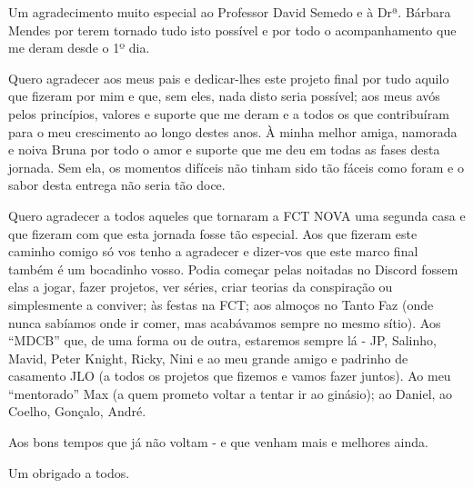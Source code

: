 
%

\begin{ntacknowledgements}


Um agradecimento muito especial ao Professor David Semedo e à Drª. Bárbara 
Mendes por terem tornado tudo isto possível e por todo o acompanhamento que 
me deram desde o 1º dia.

\medskip
Quero agradecer aos meus pais e dedicar-lhes este projeto final
por tudo aquilo que fizeram por mim e que, sem eles, nada disto seria 
possível; aos meus avós pelos princípios, valores e suporte que me deram 
e a todos os que contribuíram para o meu crescimento ao longo destes anos. 
À minha melhor amiga, namorada e noiva Bruna por todo o amor e suporte que me deu em 
todas as fases desta jornada. Sem ela, os momentos difíceis não tinham sido 
tão fáceis como foram e o sabor desta entrega não seria tão doce.

\medskip
Quero agradecer a todos aqueles que tornaram a FCT NOVA uma segunda casa e que
fizeram com que esta jornada fosse tão especial.
Aos que fizeram este caminho comigo só vos tenho a agradecer e dizer-vos 
que este marco final também é um bocadinho vosso. Podia começar pelas 
noitadas no Discord fossem elas a jogar, fazer projetos, ver séries, 
criar teorias da conspiração ou 
simplesmente a conviver; às festas na FCT; aos almoços no Tanto Faz 
(onde nunca sabíamos onde ir comer, mas acabávamos sempre no mesmo sítio). 
Aos “MDCB” que, de uma forma ou de outra, estaremos sempre lá - JP, 
Salinho, Mavid, Peter Knight, Ricky, Nini e ao meu grande amigo 
e padrinho de casamento JLO (a todos os projetos que fizemos e vamos 
fazer juntos). Ao meu “mentorado” Max (a quem prometo voltar a 
tentar ir ao ginásio); ao Daniel, ao Coelho, Gonçalo, André.

\bigskip
Aos bons tempos que já não voltam - e que venham mais e melhores ainda.

Um obrigado a todos.

\end{ntacknowledgements}